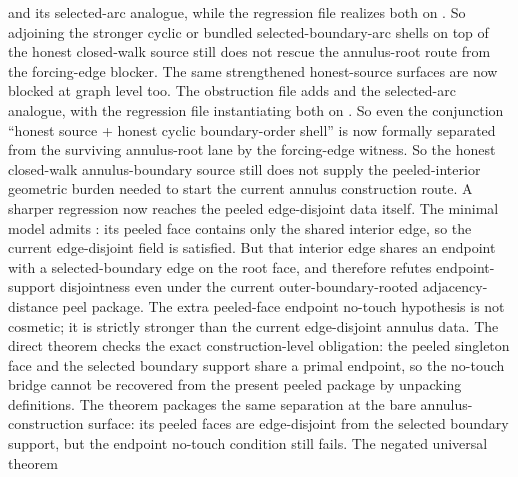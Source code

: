 \documentclass[11pt]{article}
\begin{document}
and its selected-arc analogue, while the regression file realizes both on
.  So adjoining the stronger cyclic or
bundled selected-boundary-arc shells on top of the honest closed-walk source
still does not rescue the annulus-root route from the forcing-edge blocker.
The same strengthened honest-source surfaces are now blocked at graph level
too.  The obstruction file adds
and the selected-arc analogue, with the regression file instantiating both on
.  So even the conjunction ``honest source +
honest cyclic boundary-order shell'' is now formally separated from the
surviving annulus-root lane by the forcing-edge witness.
So the honest closed-walk annulus-boundary source still does not supply the
peeled-interior geometric burden needed to start the current annulus
construction route.
A sharper regression now reaches the peeled edge-disjoint data itself.  The
minimal model  admits
: its peeled face
contains only the shared interior edge, so the current
 edge-disjoint field is satisfied.  But that interior edge
shares an endpoint with a selected-boundary edge on the root face, and
therefore refutes endpoint-support disjointness even under the current
outer-boundary-rooted adjacency-distance peel package.  The extra peeled-face
endpoint no-touch hypothesis is not cosmetic; it is strictly stronger than the
current edge-disjoint annulus data.  The direct theorem
checks the exact construction-level obligation: the peeled singleton face and
the selected boundary support share a primal endpoint, so the no-touch bridge
cannot be recovered from the present peeled package by unpacking definitions.
The theorem
packages the same separation at the bare annulus-construction surface: its
peeled faces are edge-disjoint from the selected boundary support, but the
endpoint no-touch condition still fails.  The negated universal theorem
\end{document}
